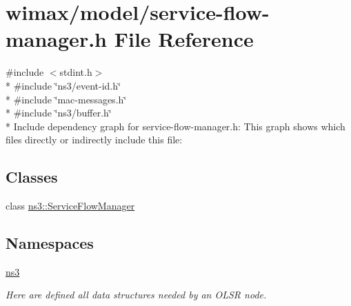 \hypertarget{service-flow-manager_8h}{}\section{wimax/model/service-\/flow-\/manager.h File Reference}
\label{service-flow-manager_8h}
{\ttfamily \#include $<$stdint.\+h$>$}\\*
{\ttfamily \#include \char`\"{}ns3/event-\/id.\+h\char`\"{}}\\*
{\ttfamily \#include \char`\"{}mac-\/messages.\+h\char`\"{}}\\*
{\ttfamily \#include \char`\"{}ns3/buffer.\+h\char`\"{}}\\*
Include dependency graph for service-\/flow-\/manager.h\+:
This graph shows which files directly or indirectly include this file\+:
\subsection*{Classes}
\begin{DoxyCompactItemize}
\item 
class \hyperlink{classns3_1_1ServiceFlowManager}{ns3\+::\+Service\+Flow\+Manager}
\end{DoxyCompactItemize}
\subsection*{Namespaces}
\begin{DoxyCompactItemize}
\item 
 \hyperlink{namespacens3}{ns3}
\begin{DoxyCompactList}\small\item\em Here are defined all data structures needed by an O\+L\+SR node. \end{DoxyCompactList}\end{DoxyCompactItemize}
